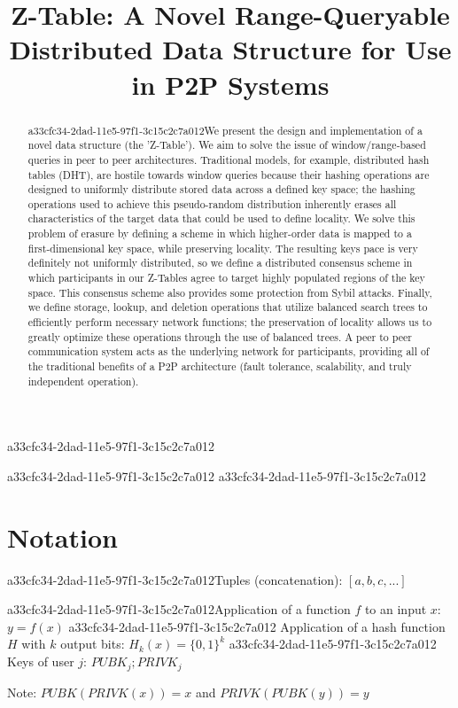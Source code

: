 \documentclass[12pt]{article}
\title{Z-Table: A Novel Range-Queryable Distributed Data Structure for Use in P2P Systems}
\begin{document}
a33cfc34-2dad-11e5-97f1-3c15c2c7a012\maketitle

\begin{abstract}
a33cfc34-2dad-11e5-97f1-3c15c2c7a012We present the design and implementation of a novel data structure (the 'Z-Table'). We aim to solve the issue of window/range-based queries in peer to peer architectures. Traditional models, for example,  distributed hash tables (DHT), are hostile towards window queries because their hashing operations are designed to uniformly distribute stored data across a defined key space; the hashing operations used to achieve this pseudo-random distribution inherently erases all characteristics of the target data that could be used to define locality. We solve this problem of erasure by defining a scheme in which higher-order data is mapped to a first-dimensional key space, while preserving locality. The resulting keys pace is very definitely not uniformly distributed, so we define a distributed consensus scheme in which participants in our Z-Tables agree to target highly populated regions of the key space. This consensus scheme also provides some protection from Sybil attacks. Finally, we define storage, lookup, and deletion operations that utilize balanced search trees to efficiently perform necessary network functions; the preservation of locality allows us to greatly optimize these operations through the use of balanced trees. A peer to peer communication system acts as the underlying network for participants, providing all of the traditional benefits of a P2P architecture (fault tolerance, scalability, and truly independent operation).
\end{abstract}
a33cfc34-2dad-11e5-97f1-3c15c2c7a012
a33cfc34-2dad-11e5-97f1-3c15c2c7a012\section{Notation}

a33cfc34-2dad-11e5-97f1-3c15c2c7a012Tuples (concatenation): $[a,b,c,...]$

a33cfc34-2dad-11e5-97f1-3c15c2c7a012Application of a function $f$ to an input $x$: $y=f(x)$
a33cfc34-2dad-11e5-97f1-3c15c2c7a012
Application of a hash function $H$ with $k$ output bits: $H_{k}(x) = \{0,1\}^k$
a33cfc34-2dad-11e5-97f1-3c15c2c7a012
Keys of user $j$: $ PUBK_j; PRIVK_j $

Note: $PUBK(PRIVK(x)) = x$ and $PRIVK(PUBK(y)) = y$~
\end{document}
